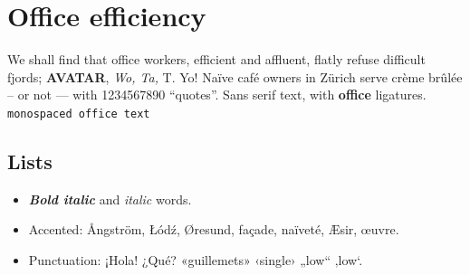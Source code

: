 \documentclass{article}
\begin{document}
\section{Office efficiency}
We shall find that office workers, efficient and affluent, flatly refuse
difficult fjords; \textbf{AVATAR}, \emph{Wo, Ta,} T. Yo! Naïve café owners in
Zürich serve crème brûlée -- or not --- with 1234567890 ``quotes''.
\textsf{Sans serif text, with \textbf{office} ligatures.}
\texttt{monospaced office text}

\subsection{Lists}
\begin{itemize}
\item \textbf{\textit{Bold italic}} and \textit{italic} words.
\item Accented: Ångström, Łódź, Øresund, façade, naïveté, Æsir, œuvre.
\item Punctuation: ¡Hola! ¿Qué? «guillemets» ‹single› „low“ ‚low‘.
\end{itemize}
\end{document}
